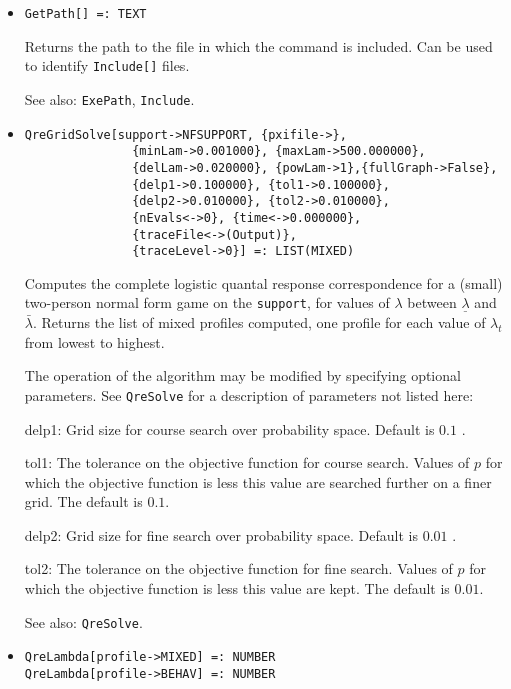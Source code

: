 \begin{itemize}
\item{}
\protect \large \begin{verbatim}
GetPath[] =: TEXT 
\end{verbatim} \normalsize

\bd
Returns the path to the file in which the command is included.  Can be
used to identify \verb+Include[]+ files. 
\item [See also:] \verb+ExePath+, \verb+Include+.
\ed

\item{}
\protect \large \begin{verbatim}
QreGridSolve[support->NFSUPPORT, {pxifile->}, 
               {minLam->0.001000}, {maxLam->500.000000}, 
               {delLam->0.020000}, {powLam->1},{fullGraph->False}, 
               {delp1->0.100000}, {tol1->0.100000}, 
               {delp2->0.010000}, {tol2->0.010000}, 
               {nEvals<->0}, {time<->0.000000}, 
               {traceFile<->(Output)}, 
               {traceLevel->0}] =: LIST(MIXED) 
\end{verbatim}\normalsize

\bd
Computes the complete logistic quantal response correspondence for
a (small) two-person normal form game on the \verb+support+, for values of
$\lambda$ between $\underline{\lambda}$ and $\bar{\lambda}.$ Returns
the list of mixed profiles computed, one profile for each value of
$\lambda_t$ from lowest to highest.

The operation of the algorithm may be modified by specifying optional
parameters.  See \verb+QreSolve+ for a description of parameters
not listed here:
\bd
\item
[delp1:] Grid size for course search over probability space.  Default
is $0.1$ .
\item
[tol1:] The tolerance on the objective function for course search.
Values of $p$ for which the objective function is less this value are
searched further on a finer grid.  The default is $0.1$.
\item
[delp2:] Grid size for fine search over probability space.  Default is
$0.01$ .
\item
[tol2:] The tolerance on the objective function for fine search.
Values of $p$ for which the objective function is less this value are
kept.  The default is $0.01$.  
\ed
\item [See also:] \verb+QreSolve+.
\ed

\item{}
\protect \large \begin{verbatim}
QreLambda[profile->MIXED] =: NUMBER 
QreLambda[profile->BEHAV] =: NUMBER 
\end{verbatim}\normalsize


\end{itemize}
